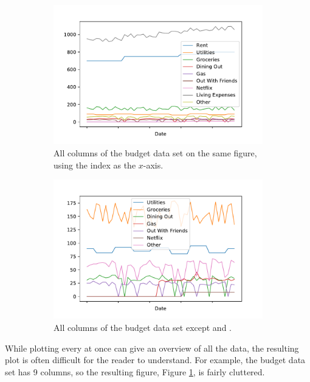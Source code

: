 \begin{figure}[H] %
\captionsetup[subfigure]{justification=centering}
\centering
\begin{subfigure}{.49\textwidth}
    \includegraphics[width=\textwidth]{figures/all_budget.pdf}
    \caption{All columns of the budget data set on the same figure, using the index as the $x$-axis.}
    \label{fig:budget-all}
\end{subfigure}
%
\begin{subfigure}{.49\textwidth}
    \includegraphics[width=\textwidth]{figures/all_budget2.pdf}
    \caption{All columns of the budget data set except  and .}
    \label{fig:budget-all-v2}
\end{subfigure}
\caption{}
\end{figure}

While plotting every  at once can give an overview of all the data, the resulting plot is often difficult for the reader to understand.
For example, the budget data set has 9 columns, so the resulting figure, Figure \ref{fig:budget-all}, is fairly cluttered.

